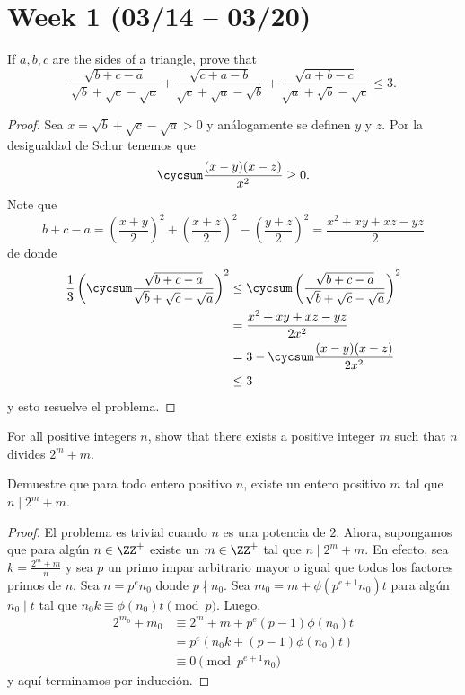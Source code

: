 \section{Week 1 (03/14 -- 03/20)}

\begin{probEG}
	If $a,b,c$ are the sides of a triangle, prove that
	\[\frac{\sqrt{b+c-a}}{\sqrt b+\sqrt c-\sqrt a}+\frac{\sqrt{c+a-b}}{\sqrt c+\sqrt a-\sqrt b}+\frac{\sqrt{a+b-c}}{\sqrt a+\sqrt b-\sqrt c}\le 3.\]
\end{probEG}

\begin{proof}
	Sea $x=\sqrt b+\sqrt c-\sqrt a>0$ y análogamente se definen $y$ y $z$. Por la desigualdad de Schur tenemos que
	\[\cycsum\frac{(x-y)(x-z)}{x^2}\ge 0.\]
	Note que
	\[b+c-a=\left(\frac{x+y}{2}\right)^2+\left(\frac{x+z}{2}\right)^2-\left(\frac{y+z}{2}\right)^2=\frac{x^2+xy+xz-yz}{2}\]
	de donde
	\begin{align*}
		\frac13\left(\cycsum\frac{\sqrt{b+c-a}}{\sqrt b+\sqrt c-\sqrt a}\right)^2
		&\le\cycsum\left(\frac{\sqrt{b+c-a}}{\sqrt b+\sqrt c-\sqrt a}\right)^2\\
		&=\frac{x^2+xy+xz-yz}{2x^2}\\
		&=3-\cycsum\frac{(x-y)(x-z)}{2x^2}\\
		&\le 3
	\end{align*}
	y esto resuelve el problema.
\end{proof}

\begin{probEB}
	For all positive integers $n$, show that there exists a positive integer $m$ such that $n$ divides $2^m+m$.
	\begin{probSP}
		Demuestre que para todo entero positivo $n$, existe un entero positivo $m$ tal que $n\mid 2^m+m$.
	\end{probSP}
\end{probEB}

\begin{proof}
	El problema es trivial cuando $n$ es una potencia de $2$. Ahora, supongamos que para algún $n\in\ZZ^+$ existe un $m\in\ZZ^+$ tal que $n\mid 2^m+m$. En efecto, sea $k=\frac{2^m+m}{n}$ y sea $p$ un primo impar arbitrario mayor o igual que todos los factores primos de $n$. Sea $n=p^en_0$ donde $p\nmid n_0$. Sea $m_0=m+\phi(p^{e+1}n_0)t$ para algún $n_0\mid t$ tal que $n_0k\equiv\phi(n_0)t\pmod p$. Luego,
	\begin{align*}
		2^{m_0}+m_0
		&\equiv 2^m+m+p^e(p-1)\phi(n_0)t\\
		&=p^e\left(n_0k+(p-1)\phi(n_0)t\right)\\
		&\equiv 0\pmod{p^{e+1}n_0}
	\end{align*}
	y aquí terminamos por inducción.
\end{proof}

